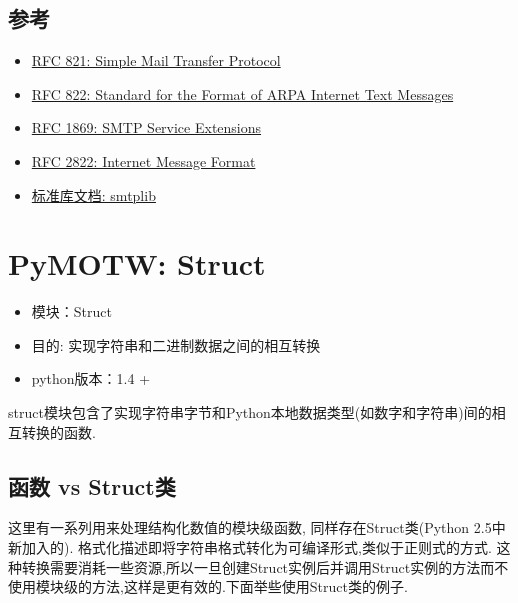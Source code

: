 \documentclass[letterpaper,10pt,english]{manual}
\begin{document}
\subsection{参考}
\begin{itemize}
\item {} 
\href{http://www.faqs.org/rfcs/rfc821.html}{RFC 821: Simple Mail Transfer Protocol}

\item {} 
\href{http://www.faqs.org/rfcs/rfc822.html}{RFC 822: Standard for the Format of ARPA Internet Text Messages}

\item {} 
\href{http://www.faqs.org/rfcs/rfc1869.html}{RFC 1869: SMTP Service Extensions}

\item {} 
\href{http://www.faqs.org/rfcs/rfc2822.html}{RFC 2822: Internet Message Format}

\item {} 
\href{http://docs.python.org/lib/module-smtplib.html}{标准库文档: smtplib}

\end{itemize}

\resetcurrentobjects


\section{PyMOTW: Struct}
\begin{itemize}
\item {} 
模块：Struct

\item {} 
目的: 实现字符串和二进制数据之间的相互转换

\item {} 
python版本：1.4 +

\end{itemize}

struct模块包含了实现字符串字节和Python本地数据类型(如数字和字符串)间的相互转换的函数.


\subsection{函数 vs Struct类}

这里有一系列用来处理结构化数值的模块级函数, 同样存在Struct类(Python 2.5中新加入的). 格式化描述即将字符串格式转化为可编译形式,类似于正则式的方式. 这种转换需要消耗一些资源,所以一旦创建Struct实例后并调用Struct实例的方法而不使用模块级的方法,这样是更有效的.下面举些使用Struct类的例子.
\end{document}
